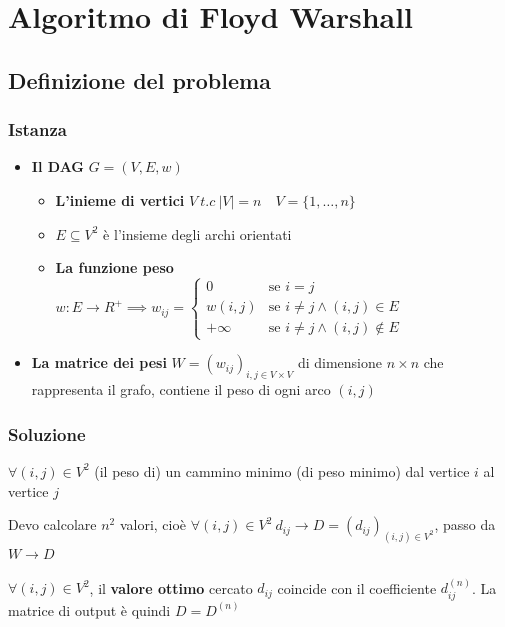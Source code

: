\usetikzlibrary{decorations.pathmorphing, decorations.pathreplacing, arrows.meta}

\chapter{Algoritmo di Floyd Warshall}

\section{Definizione del problema}
\subsection{Istanza}
\begin{itemize}
    \item \textbf{Il DAG }$G = (V,E,w)$
    \begin{itemize}
        \item \textbf{L'inieme di vertici }$V\ t.c\ |V|=n \quad V = \{1,\dots,n\}$
        \item $E \subseteq V^2$ è l'insieme degli archi orientati
        \item \textbf{La funzione peso }$w:E \to R^+ \implies 
        w_{ij}= 
        \begin{cases}
        0 &\text{se } i=j \\
        w(i,j) &\text{se } i \not = j \land (i,j) \in E \\
        +\infty &\text{se } i \not = j \land (i,j) \not \in E 
        \end{cases}
        $
    \end{itemize}
    \item \textbf{La matrice dei pesi }$W=(w_{ij})_{i,j\in V \times V}$  di dimensione $n \times n$ che rappresenta il grafo, contiene il peso di ogni arco $(i,j)$
\end{itemize}

\subsection{Soluzione}
$\forall (i,j) \in V^2$ (il peso di) un cammino minimo (di peso minimo) dal vertice $i$ al vertice $j$

Devo calcolare $n^2$ valori, cioè $\forall (i,j)\in V^2 \ d_{ij}\to D=(d_{ij})_{(i,j) \in V^2}$, passo da $W \to D$

$\forall (i,j) \in V^2$, il \textbf{valore ottimo} cercato $d_{ij}$ coincide con il coefficiente $d_{ij}^(n)$. La matrice di output è quindi $D=D^{(n)}$

